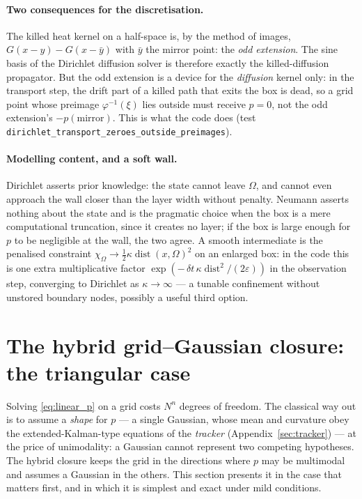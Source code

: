 \documentclass[11pt,a4paper]{article}
\newcommand{\eps}{\varepsilon}
\newcommand{\dt}{\,\delta t}
\theoremstyle{plain}
\theoremstyle{definition}
\theoremstyle{remark}
\begin{document}
\paragraph{Two consequences for the discretisation.}
The killed heat kernel on a half-space is, by the method of images, $G(x-y)-G(x-\bar y)$ with $\bar y$ the mirror point: the \emph{odd extension}. The sine basis of the Dirichlet diffusion solver is therefore exactly the killed-diffusion propagator. But the odd extension is a device for the \emph{diffusion} kernel only: in the transport step, the drift part of a killed path that exits the box is dead, so a grid point whose preimage $\varphi^{-1}(\xi)$ lies outside must receive $p=0$, not the odd extension's $-p(\text{mirror})$. This is what the code does (test \texttt{dirichlet\_transport\_zeroes\_outside\_preimages}).

\paragraph{Modelling content, and a soft wall.}
Dirichlet asserts prior knowledge: the state cannot leave $\Omega$, and cannot even approach the wall closer than the layer width without penalty. Neumann asserts nothing about the state and is the pragmatic choice when the box is a mere computational truncation, since it creates no layer; if the box is large enough for $p$ to be negligible at the wall, the two agree. A smooth intermediate is the penalised constraint $\chi_\Omega \to \tfrac12\kappa\operatorname{dist}(x,\Omega)^2$ on an enlarged box: in the code this is one extra multiplicative factor $\exp(-\dt\,\kappa\operatorname{dist}^2/(2\eps))$ in the observation step, converging to Dirichlet as $\kappa\to\infty$ --- a tunable confinement without unstored boundary nodes, possibly a useful third option.

\section{The hybrid grid--Gaussian closure: the triangular case}
\label{sec:main}

Solving \eqref{eq:linear_p} on a grid costs $N^n$ degrees of freedom. The classical way out is to assume a \emph{shape} for $p$ --- a single Gaussian, whose mean and curvature obey the extended-Kalman-type equations of the \emph{tracker} (Appendix~\ref{sec:tracker}) --- at the price of unimodality: a Gaussian cannot represent two competing hypotheses. The hybrid closure keeps the grid in the directions where $p$ may be multimodal and assumes a Gaussian in the others. This section presents it in the case that matters first, and in which it is simplest and exact under mild conditions.
\end{document}
